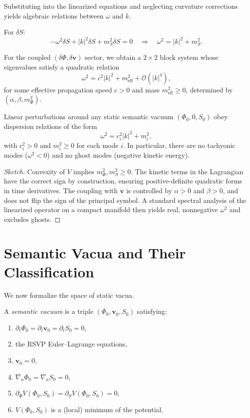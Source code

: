 Substituting into the linearized equations and neglecting curvature corrections
yields algebraic relations between $\omega$ and $k$.

For $\delta S$:
\[
-\omega^2 \delta S + |k|^2 \delta S + m_S^2 \delta S = 0
\quad\Rightarrow\quad
\omega^2 = |k|^2 + m_S^2.
\]

For the coupled $(\delta\Phi,\delta\mathbf{v})$ sector, we obtain a $2\times 2$
block system whose eigenvalues satisfy a quadratic relation
\[
\omega^2 = c^2 |k|^2 + m_\mathrm{eff}^2 + \mathcal{O}(|k|^4),
\]
for some effective propagation speed $c>0$ and mass $m_\mathrm{eff}^2 \ge 0$,
determined by $(\alpha,\beta,m_\Phi^2)$.

\begin{proposition}
\label{prop:dispersion}
Linear perturbations around any static semantic vacuum $(\Phi_0,0,S_0)$ obey
dispersion relations of the form
\[
\omega^2 = c_i^2 |k|^2 + m_i^2,
\]
with $c_i^2>0$ and $m_i^2 \ge 0$ for each mode $i$.  
In particular, there are no tachyonic modes ($\omega^2<0$) and no ghost
modes (negative kinetic energy).
\end{proposition}

\begin{proof}[Sketch]
Convexity of $V$ implies $m_\Phi^2,m_S^2\ge 0$. The kinetic terms in the
Lagrangian have the correct sign by construction, ensuring positive-definite
quadratic forms in time derivatives. The coupling with $\mathbf{v}$ is
controlled by $\alpha>0$ and $\beta>0$, and does not flip the sign of the
principal symbol. A standard spectral analysis of the linearized operator on a
compact manifold then yields real, nonnegative $\omega^2$ and excludes ghosts.
\end{proof}

\section{Semantic Vacua and Their Classification}

We now formalize the space of static vacua.

\begin{definition}
A \emph{semantic vacuum} is a triple $(\Phi_0,\mathbf{v}_0,S_0)$ satisfying:
\begin{enumerate}
  \item $\partial_t \Phi_0 = \partial_t \mathbf{v}_0 = \partial_t S_0 = 0$,
  \item the RSVP Euler--Lagrange equations,
  \item $\mathbf{v}_0 = 0$,
  \item $\nabla_a \Phi_0 = \nabla_a S_0 = 0$,
  \item $\partial_\Phi V(\Phi_0,S_0)=\partial_S V(\Phi_0,S_0)=0$,
  \item $V(\Phi_0,S_0)$ is a (local) minimum of the potential.
\end{enumerate}
\end{definition}

